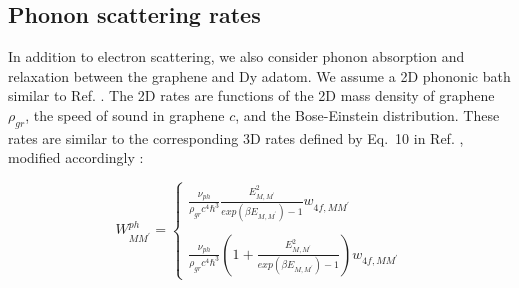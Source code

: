 \documentclass[reprint,amsmath,amssymb,aps,nofootinbib,onecolumn]{revtex4-2}
\begin{document}

\subsection{Phonon scattering rates}
\label{phonon}
In addition to electron scattering, we also consider phonon absorption and relaxation between the graphene and Dy adatom. We assume a 2D phononic bath similar to Ref. \cite{cervetti2016}. The 2D rates are functions of the 2D mass density of graphene $\rho_{gr}$, the speed of sound in graphene $c$, and the Bose-Einstein distribution. These rates are similar to the corresponding 3D rates defined by Eq.~10 in Ref. \cite{politi_tunneling_1995}, modified accordingly \cite{cervetti2016}: 

\begin{equation}
    W_{MM^{\prime}}^{ph} =
    \begin{cases}
        \displaystyle
        \frac{ \nu_{ph}}{\rho_{gr} c^4 \hbar^3} \frac{E_{M,M^{\prime}}^2}{exp(\beta E_{M,M^{\prime}}) - 1} w_{4f,MM^{\prime}}\\
        \\
        \displaystyle
         \frac{ \nu_{ph}}{\rho_{gr} c^4 \hbar^3} \left( 1 + \frac{E_{M,M^{\prime}}^2}{exp(\beta E_{M,M^{\prime}}) - 1}\right) w_{4f,MM^{\prime}}
    \end{cases}
\label{eq:phonon_rates}    
\end{equation}

\end{document}
